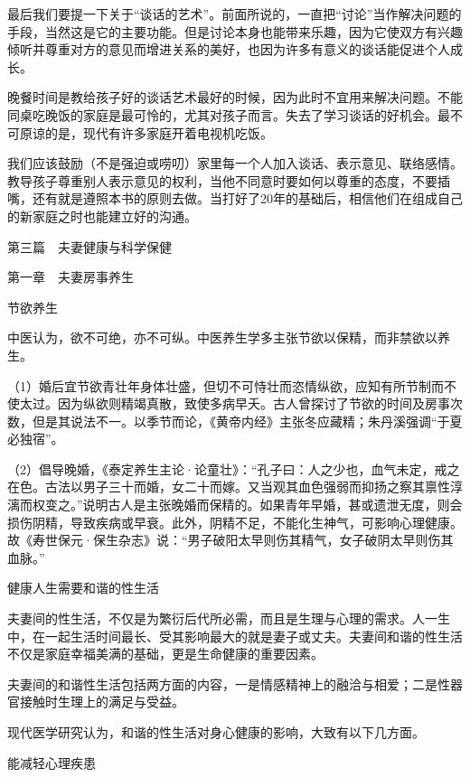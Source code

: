 \documentclass[12pt,UTF8]{ctexbook}
\begin{document}
最后我们要提一下关于“谈话的艺术”。前面所说的，一直把“讨论”当作解决问题的手段，当然这是它的主要功能。但是讨论本身也能带来乐趣，因为它使双方有兴趣倾听并尊重对方的意见而增进关系的美好，也因为许多有意义的谈话能促进个人成长。

晚餐时间是教给孩子好的谈话艺术最好的时候，因为此时不宜用来解决问题。不能同桌吃晚饭的家庭是最可怜的，尤其对孩子而言。失去了学习谈话的好机会。最不可原谅的是，现代有许多家庭开着电视机吃饭。

我们应该鼓励（不是强迫或唠叨）家里每一个人加入谈话、表示意见、联络感情。教导孩子尊重别人表示意见的权利，当他不同意时要如何以尊重的态度，不要插嘴，还有就是遵照本书的原则去做。当打好了20年的基础后，相信他们在组成自己的新家庭之时也能建立好的沟通。





第三篇　夫妻健康与科学保健





第一章　夫妻房事养生


节欲养生


中医认为，欲不可绝，亦不可纵。中医养生学多主张节欲以保精，而非禁欲以养生。

（1）婚后宜节欲青壮年身体壮盛，但切不可恃壮而恣情纵欲，应知有所节制而不使太过。因为纵欲则精竭真散，致使多病早夭。古人曾探讨了节欲的时间及房事次数，但是其说法不一。以季节而论，《黄帝内经》主张冬应藏精；朱丹溪强调“于夏必独宿”。

（2）倡导晚婚，《泰定养生主论·论童壮》：“孔子曰：人之少也，血气未定，戒之在色。古法以男子三十而婚，女二十而嫁。又当观其血色强弱而抑扬之察其禀性淳漓而权变之。”说明古人是主张晚婚而保精的。如果青年早婚，甚或遗泄无度，则会损伤阴精，导致疾病或早衰。此外，阴精不足，不能化生神气，可影响心理健康。故《寿世保元·保生杂志》说：“男子破阳太早则伤其精气，女子破阴太早则伤其血脉。”





健康人生需要和谐的性生活


夫妻间的性生活，不仅是为繁衍后代所必需，而且是生理与心理的需求。人一生中，在一起生活时间最长、受其影响最大的就是妻子或丈夫。夫妻间和谐的性生活不仅是家庭幸福美满的基础，更是生命健康的重要因素。

夫妻间的和谐性生活包括两方面的内容，一是情感精神上的融洽与相爱；二是性器官接触时生理上的满足与受益。

现代医学研究认为，和谐的性生活对身心健康的影响，大致有以下几方面。

能减轻心理疾患
\end{document}
